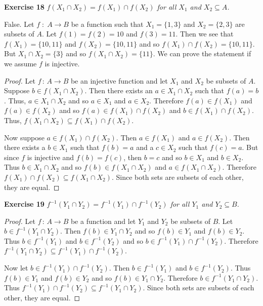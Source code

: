 \documentclass{article}
\begin{document}
\begin{flushleft}
\textbf{Exercise 18}
\textsl{$f(X_1 \cap X_2) = f(X_1) \cap f(X_2)$ for all $X_1$ and $X_2 \subseteq A$.}\newline

False. Let $f \; : \; A \rightarrow B$ be a function such that $X_1=\{1,3\}$ and $X_2 = \{2,3\}$ are subsets of $A$. Let $f(1)=f(2)=10$ and $f(3)=11$. Then we see that $f(X_1) = \{10,11\}$ and $f(X_2) = \{10,11\}$ and so $f(X_1) \cap f(X_2) = \{10,11\}$. But $X_1 \cap X_2 = \{3\}$ and so $f(X_1 \cap X_2) = \{11\}$. We can prove the statement if we assume $f$ is injective.
\begin{proof}
Let $f \, : \, A \rightarrow B$ be an injective function and let $X_1$ and $X_2$ be subsets of $A$. Suppose $b \in f(X_1 \cap X_2)$. Then there exists an $a \in X_1 \cap X_2$ such that $f(a) = b$. Thus, $a \in X_1 \cap X_2$ and so $a \in X_1$ and $a \in X_2$. Therefore $f(a) \in f(X_1)$ and $f(a) \in f(X_2)$ and so $f(a) \in f(X_1) \cap f(X_2)$ and $b \in f(X_1) \cap f(X_2)$. Thus, $f(X_1 \cap X_2) \subseteq f(X_1) \cap f(X_2)$.\newline

Now suppose $a \in f(X_1) \cap f(X_2)$. Then $a \in f(X_1)$ and $a \in f(X_2)$. Then there exists a $b\in X_1$ such that $f(b) = a$ and a $c \in X_2$ such that $f(c) = a$. But since $f$ is injective and $f(b) = f(c)$, then $b=c$ and so $b \in X_1$ and $b \in X_2$. Thus $b \in X_1 \cap X_2$ and so $f(b) \in f(X_1 \cap X_2)$ and $a \in f(X_1 \cap X_2)$. Therefore $f(X_1) \cap f(X_2) \subseteq f(X_1 \cap X_2)$. Since both sets are subsets of each other, they are equal.
\end{proof}

\textbf{Exercise 19}
\textsl{$f^{-1}(Y_1 \cap Y_2) = f^{-1}(Y_1) \cap f^{-1}(Y_2)$ for all $Y_1$ and $Y_2 \subseteq B$.}
\begin{proof}
Let $f \, : \, A \rightarrow B$ be a function and let $Y_1$ and $Y_2$ be subsets of $B$. Let $b \in f^{-1}(Y_1 \cap Y_2)$. Then $f(b) \in Y_1 \cap Y_2$ and so $f(b) \in Y_1$ and $f(b) \in Y_2$. Thus $b \in f^{-1}(Y_1)$ and $b \in f^{-1}(Y_2)$ and so $b \in f^{-1}(Y_1) \cap f^{-1}(Y_2)$. Therefore $f^{-1}(Y_1 \cap Y_2) \subseteq f^{-1}(Y_1) \cap f^{-1}(Y_2)$.\newline

Now let $b \in f^{-1}(Y_1) \cap f^{-1}(Y_2)$. Then $b \in f^{-1}(Y_1)$ and $b \in f^{-1}(Y_2)$. Thus $ f(b) \in Y_1$ and $f(b) \in Y_2$ and so $f(b) \in Y_1 \cap Y_2$. Therefore $b \in f^{-1}(Y_1 \cap Y_2)$. Thus $f^{-1}(Y_1) \cap f^{-1}(Y_2) \subseteq f^{-1}(Y_1 \cap Y_2)$. Since both sets are subsets of each other, they are equal.
\end{proof}


\end{flushleft}
\end{document}
